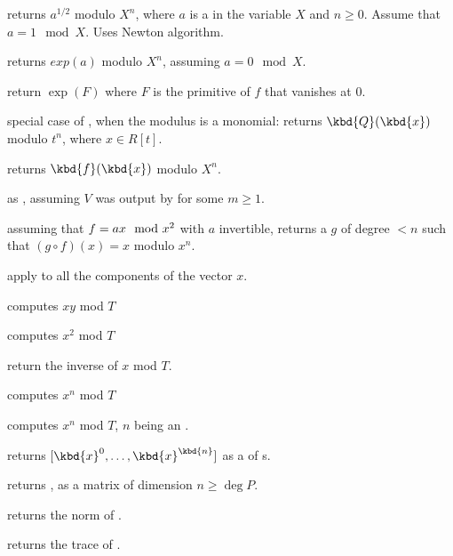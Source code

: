  returns $a^{1/2}$ modulo $X^n$,
where $a$ is a  in the variable $X$ and $n \geq 0$.
Assume that $a = 1 \mod{X}$. Uses Newton algorithm.

 returns $exp(a)$ modulo $X^n$, assuming
$a = 0 \mod{X}$.

 return $\exp(F)$
where $F$ is the primitive of $f$ that vanishes at $0$.

 special case of
, when the modulus is a monomial:
returns $\kbd{Q}(\kbd{x})$ modulo $t^n$, where $x \in R[t]$.

 returns $\kbd{f}(\kbd{x})$ modulo
$X^n$.

 as ,
assuming $V$ was output by  for some $m\geq 1$.

 assuming that $f = a\*x \mod{x^2}$
with $a$ invertible, returns a  $g$ of degree $< n$ such that $(g
\circ f)(x) = x$ modulo $x^n$.


 apply 
to all the components of the vector $x$.


 computes $xy$ mod $T$

 computes $x^2$ mod $T$

 return the inverse of $x$ mod $T$.

 computes $x^n$ mod $T$

 computes $x^n$ mod $T$,
$n$ being an .

 returns $[\kbd{x}^0,
\dots, \kbd{x}^\kbd{n}]$ as a  of s.

 returns
, as a matrix of dimension $n \geq \deg P$.

 returns the norm of .

 returns the trace of .

